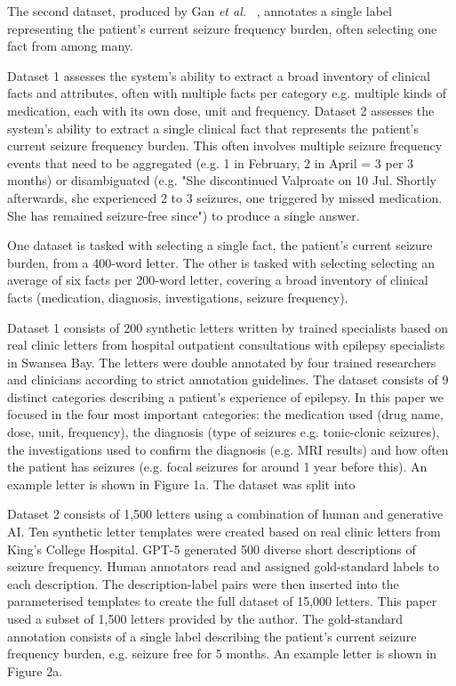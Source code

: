 \documentclass[conference]{IEEEtran}
\begin{document}
The second dataset, produced by Gan \emph{et al.}~\cite{b3} , 
annotates a single label representing the patient's current seizure 
frequency burden, often selecting one fact from among many. 

Dataset 1 assesses the system's ability to extract a 
broad inventory of clinical facts and attributes, often with multiple facts 
per category e.g. multiple kinds of medication, each with its own dose, 
unit and frequency. Dataset 2 assesses the system's ability to extract
a single clinical fact that represents the patient's current seizure frequency
burden. This often involves multiple seizure frequency events that need to be
aggregated (e.g. 1 in February, 2 in April = 3 per 3 months) or disambiguated
(e.g. "She discontinued Valproate on 10 Jul. Shortly afterwards, she experienced
2 to 3 seizures, one triggered by missed medication. She has remained 
seizure-free since") to produce a single answer.

One dataset is tasked with selecting a
single fact, the patient's current seizure burden, from a 400-word 
letter.  The other is tasked with selecting selecting an average of 
six facts per 200-word letter, covering a broad inventory of clinical 
facts (medication, diagnosis, investigations, seizure frequency).

Dataset 1 consists of 200 synthetic letters written by
trained specialists based on real clinic letters from hospital outpatient
consultations with epilepsy specialists in Swansea Bay. The letters 
were double annotated by four trained researchers and clinicians
according to strict annotation guidelines. The dataset consists of 9
distinct categories describing a patient's experience of epilepsy. In this
paper we focused in the four most important categories: the medication
used (drug name, dose, unit, frequency), the diagnosis (type of seizures 
e.g. tonic-clonic seizures), the investigations used to confirm the diagnosis
(e.g. MRI results) and how often the patient has seizures (e.g. focal seizures
for around 1 year before this). An example letter is shown in Figure 1a. The 
dataset was split into 

Dataset 2 consists of 1,500 letters using a combination of 
human and generative AI. Ten synthetic letter templates were created 
based on real clinic letters from King's College Hospital. GPT-5 
generated 500 diverse short descriptions of seizure frequency. Human 
annotators read and assigned gold-standard labels to each 
description. The description-label pairs were then inserted into the 
parameterised templates to create the full dataset of 15,000 letters. This
paper used a subset of 1,500 letters provided by the author. The 
gold-standard annotation consists of a single label describing the patient's 
current seizure frequency burden, e.g. seizure free for 5 months. An example 
letter is shown in Figure 2a.
\end{document}

